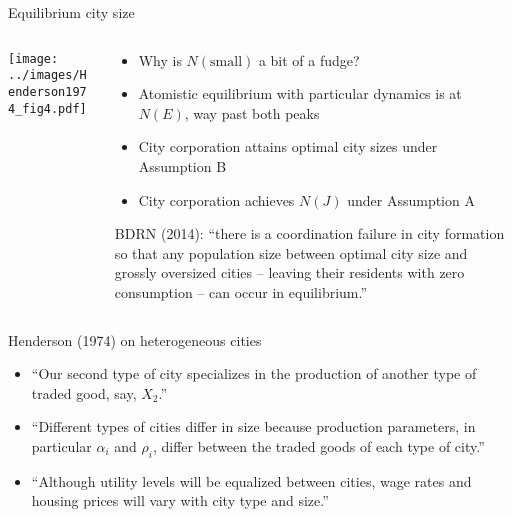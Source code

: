 \documentclass[11pt,notes=hide,aspectratio=169]{beamer}
\begin{document}
\begin{frame}{Equilibrium city size}
\begin{columns}
\begin{column}{.48\textwidth}
\texttt{[image: ../images/Henderson1974\_fig4.pdf]}
\end{column}
\begin{column}{.5\textwidth}
\begin{itemize}
\item Why is $N(\text{small})$ a bit of a fudge?
\item Atomistic equilibrium with particular dynamics is at $N(E)$, way past both peaks
\item City corporation attains optimal city sizes under Assumption B
\item City corporation achieves $N(J)$ under Assumption A
\end{itemize}
{\footnotesize BDRN (2014): ``there is a coordination failure in city formation so that any population size between optimal city size and grossly oversized cities -- leaving their residents with zero consumption -- can occur in equilibrium.''\par}
\end{column}
\end{columns}
\end{frame}
\begin{frame}{Henderson (1974) on heterogeneous cities}
\begin{itemize}
    \item ``Our second type of city specializes in the production of another type of traded good, say, $X_2$.''
    \item ``Different types of cities differ in size because production parameters, in particular $\alpha_i$ and $\rho_i$, differ between the traded goods of each type of city.''
    \item ``Although utility levels will be equalized between cities, wage rates and housing prices will vary with city type and size.''
\end{itemize}
\end{frame}
\end{document}
